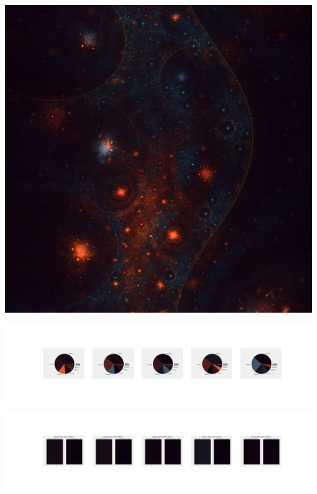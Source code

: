 \documentclass[11pt]{article}
\begin{document}
\begin{landscape}
    \begin{center}
    \includegraphics[width=\textwidth]{./nbimg/file (257).jpg}
    \end{center}

    \begin{center}
    \includegraphics[width=250mm]{./nbimg/pie-175.jpg}
    \end{center}

    \begin{center}
    \includegraphics[width=250mm]{./nbimg/peak-175.jpg}
    \end{center}
    


\end{landscape}
\end{document}
